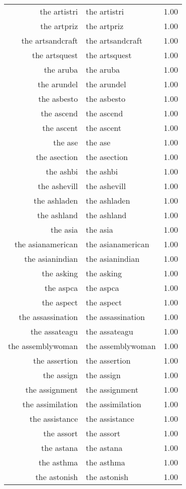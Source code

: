 \begin{table}[ht]
\begin{tabular}{rlr}
  the artistri & the artistri & 1.00 \\ 
  the artpriz & the artpriz & 1.00 \\ 
  the artsandcraft & the artsandcraft & 1.00 \\ 
  the artsquest & the artsquest & 1.00 \\ 
  the aruba & the aruba & 1.00 \\ 
  the arundel & the arundel & 1.00 \\ 
  the asbesto & the asbesto & 1.00 \\ 
  the ascend & the ascend & 1.00 \\ 
  the ascent & the ascent & 1.00 \\ 
  the ase & the ase & 1.00 \\ 
  the asection & the asection & 1.00 \\ 
  the ashbi & the ashbi & 1.00 \\ 
  the ashevill & the ashevill & 1.00 \\ 
  the ashladen & the ashladen & 1.00 \\ 
  the ashland & the ashland & 1.00 \\ 
  the asia & the asia & 1.00 \\ 
  the asianamerican & the asianamerican & 1.00 \\ 
  the asianindian & the asianindian & 1.00 \\ 
  the asking & the asking & 1.00 \\ 
  the aspca & the aspca & 1.00 \\ 
  the aspect & the aspect & 1.00 \\ 
  the assassination & the assassination & 1.00 \\ 
  the assateagu & the assateagu & 1.00 \\ 
  the assemblywoman & the assemblywoman & 1.00 \\ 
  the assertion & the assertion & 1.00 \\ 
  the assign & the assign & 1.00 \\ 
  the assignment & the assignment & 1.00 \\ 
  the assimilation & the assimilation & 1.00 \\ 
  the assistance & the assistance & 1.00 \\ 
  the assort & the assort & 1.00 \\ 
  the astana & the astana & 1.00 \\ 
  the asthma & the asthma & 1.00 \\ 
  the astonish & the astonish & 1.00 \\ 

\end{tabular}
\end{table}
